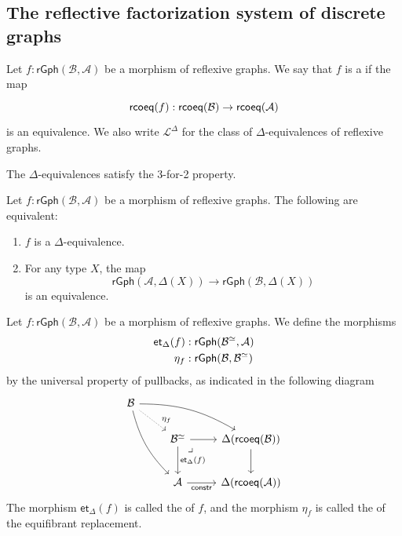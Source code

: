 \subsection{The reflective factorization system of discrete graphs}

\begin{defn}
Let $f:\mathsf{rGph}(\mathcal{B},\mathcal{A})$ be a morphism of reflexive graphs. We say that $f$ is a  if the map
\begin{equation*}
\begin{tikzcd}
\rcoeq(f):\rcoeq(\mathcal{B})\to \rcoeq(\mathcal{A})
\end{tikzcd}
\end{equation*}
is an equivalence. We also write $\mathcal{L}^\Delta$ for the class of $\Delta$-equivalences of reflexive graphs.
\end{defn}

\begin{lem}
The $\Delta$-equivalences satisfy the 3-for-2 property.
\end{lem}

\begin{prp}
Let $f:\mathsf{rGph}(\mathcal{B},\mathcal{A})$ be a morphism of reflexive graphs. The following are equivalent:
\begin{enumerate}
\item $f$ is a $\Delta$-equivalence.
\item For any type $X$, the map
\begin{equation*}
\mathsf{rGph}(\mathcal{A},\Delta(X))\to\mathsf{rGph}(\mathcal{B},\Delta(X))
\end{equation*}
is an equivalence.
\end{enumerate}
\end{prp}

\begin{defn}
Let $f:\mathsf{rGph}(\mathcal{B},\mathcal{A})$ be a morphism of reflexive graphs. We define the morphisms
\begin{align*}
\mathsf{et}_\Delta(f) & : \mathsf{rGph}(\mathcal{B}^{\simeq},\mathcal{A}) \\
\mathsf{\eta}_f & : \mathsf{rGph}(\mathcal{B},\mathcal{B}^{\simeq})
\end{align*}
by the universal property of pullbacks, as indicated in the following diagram
\begin{equation*}
\begin{tikzcd}
\mathcal{B} \arrow[ddr,bend right=15] \arrow[drr,bend left=15] \arrow[dr,densely dotted,"\eta_f" near end] \\
& \mathcal{B}^{\eqvsym} \arrow[dr,phantom,"\lrcorner" {very near start,xshift=-1ex}] \arrow[d,"\mathsf{et}_\Delta(f)"] \arrow[r] & \Delta(\rcoeq(\mathcal{B})) \arrow[d] \\[1ex]
& \mathcal{A} \arrow[r,swap,"\mathsf{constr}"] & \Delta(\rcoeq(\mathcal{A}))
\end{tikzcd}
\end{equation*}
The morphism $\mathsf{et}_\Delta(f)$ is called the  of $f$, and the morphism $\eta_f$ is called the  of the equifibrant replacement.
\end{defn}

